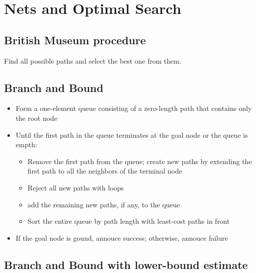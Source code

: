 \section{Nets and Optimal Search}

\subsection{British Museum procedure}

Find all possible paths and select the best one from them.

\subsection{Branch and Bound}

\begin{itemize}
  \item Form a one-element queue consisting of a zero-length path 
    that contains only the root node
  \item Until the first path in the queue terminates at the 
    goal node or the queue is empth:
    \begin{itemize}
      \item Remove the first path from the queue; create new paths 
        by extending the first path to all the neighbors
        of the terminal node
      \item Reject all new paths with loops
      \item add the remaining new paths, if any, to the queue
      \item Sort the entire queue by path length with 
        least-cost paths in front
    \end{itemize}
  \item If the goal node is gound, annouce success; otherwise, 
    annouce failure
\end{itemize}

\subsection{Branch and Bound with lower-bound estimate}

